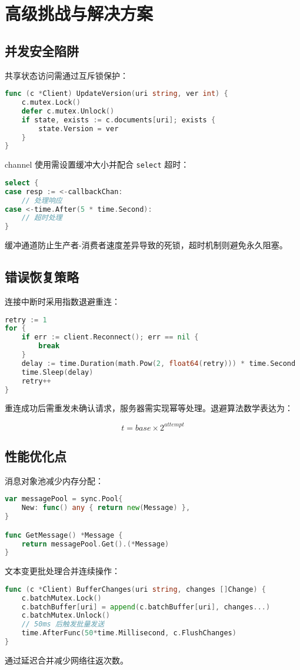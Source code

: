 \chapter{高级挑战与解决方案}
\section{并发安全陷阱}
共享状态访问需通过互斥锁保护：\par
\begin{lstlisting}[language=go]
func (c *Client) UpdateVersion(uri string, ver int) {
    c.mutex.Lock()
    defer c.mutex.Unlock()
    if state, exists := c.documents[uri]; exists {
        state.Version = ver
    }
}
\end{lstlisting}
channel 使用需设置缓冲大小并配合 \texttt{select} 超时：\par
\begin{lstlisting}[language=go]
select {
case resp := <-callbackChan:
    // 处理响应
case <-time.After(5 * time.Second):
    // 超时处理
}
\end{lstlisting}
缓冲通道防止生产者-消费者速度差异导致的死锁，超时机制则避免永久阻塞。\par
\section{错误恢复策略}
连接中断时采用指数退避重连：\par
\begin{lstlisting}[language=go]
retry := 1
for {
    if err := client.Reconnect(); err == nil {
        break
    }
    delay := time.Duration(math.Pow(2, float64(retry))) * time.Second
    time.Sleep(delay)
    retry++
}
\end{lstlisting}
重连成功后需重发未确认请求，服务器需实现幂等处理。退避算法数学表达为：\par
$$ t = base \times 2^{attempt} $$\par
\section{性能优化点}
消息对象池减少内存分配：\par
\begin{lstlisting}[language=go]
var messagePool = sync.Pool{
    New: func() any { return new(Message) },
}

func GetMessage() *Message {
    return messagePool.Get().(*Message)
}
\end{lstlisting}
文本变更批处理合并连续操作：\par
\begin{lstlisting}[language=go]
func (c *Client) BufferChanges(uri string, changes []Change) {
    c.batchMutex.Lock()
    c.batchBuffer[uri] = append(c.batchBuffer[uri], changes...)
    c.batchMutex.Unlock()
    // 50ms 后触发批量发送
    time.AfterFunc(50*time.Millisecond, c.FlushChanges)
}
\end{lstlisting}
通过延迟合并减少网络往返次数。\par
